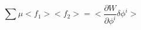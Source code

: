 \begin{equation}
\sum \mu <f_1><f_2> =  < \frac{\partial W}{\partial\phi^i} \delta\phi^i>
\end{equation}

